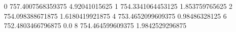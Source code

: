 0 757.4007568359375 4.92041015625
1 754.3341064453125 1.853759765625
2 754.098388671875 1.6180419921875
4 753.4652099609375 0.98486328125
6 752.4803466796875 0.0
8 754.464599609375 1.9842529296875

